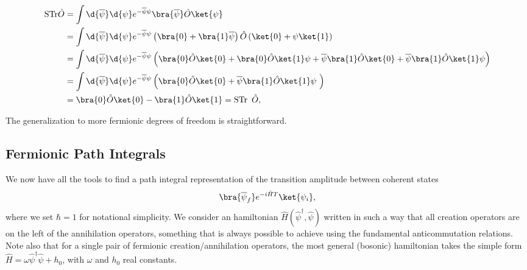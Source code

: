 \begin{enumerate}[start=0]
          \[
              \begin{aligned}
                  \mathrm{STr} \hat{O} & = \int \d{\overline{\psi}} \d{\psi} e^{-\overline{\psi} \psi} \bra{\overline{\psi}} \hat{O} \ket{\psi}                                                                                                                       \\
                                       & = \int \d{\overline{\psi}} \d{\psi} e^{-\overline{\psi} \psi} \left( \bra{0} + \bra{1} \overline{\psi} \right) \hat{O} \left( \ket{0} + \psi \ket{1} \right)                                                                 \\
                                       & = \int \d{\overline{\psi}} \d{\psi} e^{-\overline{\psi} \psi} \left( \bra{0} \hat{O} \ket{0} + \bra{0} \hat{O} \ket{1} \psi + \overline{\psi} \bra{1} \hat{O} \ket{0} + \overline{\psi} \bra{1} \hat{O} \ket{1} \psi \right) \\
                                       & = \int \d{\overline{\psi}} \d{\psi} e^{-\overline{\psi} \psi} \left( \bra{0} \hat{O} \ket{0} + \overline{\psi} \bra{1} \hat{O} \ket{1} \psi  \right)                                                                         \\
                                       & = \bra{0} \hat{O} \ket{0} - \bra{1} \hat{O} \ket{1} = \mathrm{STr}\, \hat{O},
              \end{aligned}
          \]
\end{enumerate}
The generalization to more fermionic degrees of freedom is straightforward.

\subsection{Fermionic Path Integrals}

We now have all the tools to find a path integral representation of the transition amplitude between coherent states
\[
    \bra{\overline{\psi}_f} e^{-i \hat{H} T} \ket{\psi_i},
\]
where we set \(\hbar=1\) for notational simplicity. We consider an hamiltonian \(\hat{H}(\hat{\psi}^\dagger, \hat{\psi})\) written in such a way that all creation operators are on the left of the annihilation operators, something that is always possible to achieve using the fundamental anticommutation relations. Note also that for a single pair of fermionic creation/annihilation operators, the most general (bosonic) hamiltonian takes the simple form \(\hat{H} = \omega \hat{\psi}^\dagger \hat{\psi} + h_0\), with \(\omega\) and \(h_0\) real constants.

